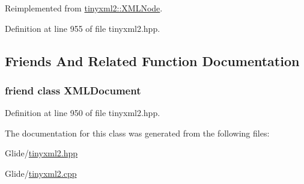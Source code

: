 Reimplemented from \hyperlink{classtinyxml2_1_1_x_m_l_node_a71f5ae90296dbe67979f83fe97073efa}{tinyxml2\-::\-X\-M\-L\-Node}.



Definition at line 955 of file tinyxml2.\-hpp.



\subsection{Friends And Related Function Documentation}
\hypertarget{classtinyxml2_1_1_x_m_l_unknown_a4eee3bda60c60a30e4e8cd4ea91c4c6e}{
\subsubsection[{X\-M\-L\-Document}]{\setlength{\rightskip}{0pt plus 5cm}friend class {\bf X\-M\-L\-Document}\hspace{0.3cm}{\ttfamily [friend]}}}\label{classtinyxml2_1_1_x_m_l_unknown_a4eee3bda60c60a30e4e8cd4ea91c4c6e}


Definition at line 950 of file tinyxml2.\-hpp.



The documentation for this class was generated from the following files\-:\begin{DoxyCompactItemize}
\item 
Glide/\hyperlink{tinyxml2_8hpp}{tinyxml2.\-hpp}\item 
Glide/\hyperlink{tinyxml2_8cpp}{tinyxml2.\-cpp}\end{DoxyCompactItemize}
